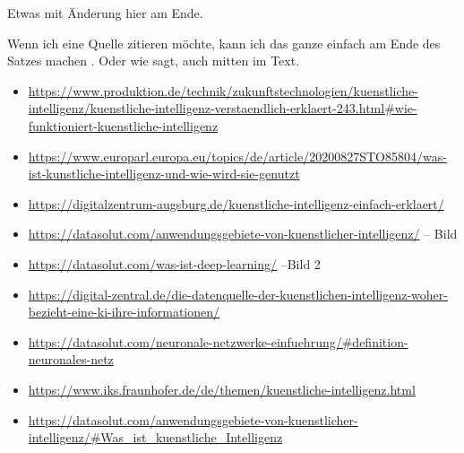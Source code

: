 \documentclass{report}
\begin{document}
Etwas mit Änderung hier am Ende.

Wenn ich eine Quelle zitieren möchte, kann ich das ganze einfach am Ende des Satzes machen \citep{example}. Oder wie \citet{example} sagt, auch mitten im Text.


\begin{itemize}
\item \url{https://www.produktion.de/technik/zukunftstechnologien/kuenstliche-intelligenz/kuenstliche-intelligenz-verstaendlich-erklaert-243.html#wie-funktioniert-kuenstliche-intelligenz}
\item \url{https://www.europarl.europa.eu/topics/de/article/20200827STO85804/was-ist-kunstliche-intelligenz-und-wie-wird-sie-genutzt}
\item \url{https://digitalzentrum-augsburg.de/kuenstliche-intelligenz-einfach-erklaert/}
\item \url{https://datasolut.com/anwendungsgebiete-von-kuenstlicher-intelligenz/} -- Bild
\item \url{https://datasolut.com/was-ist-deep-learning/} --Bild 2
\item \url{https://digital-zentral.de/die-datenquelle-der-kuenstlichen-intelligenz-woher-bezieht-eine-ki-ihre-informationen/}
\item \url{https://datasolut.com/neuronale-netzwerke-einfuehrung/#definition-neuronales-netz}
\item \url{https://www.iks.fraunhofer.de/de/themen/kuenstliche-intelligenz.html}
\item \url{https://datasolut.com/anwendungsgebiete-von-kuenstlicher-intelligenz/#Was_ist_kuenstliche_Intelligenz}
\end{itemize}

\printbibliography
\end{document}

